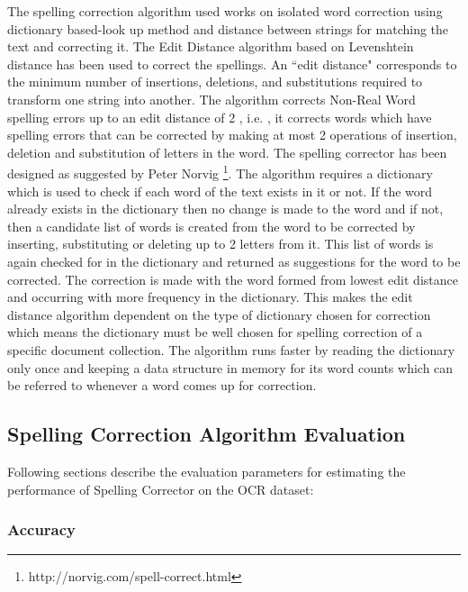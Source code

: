 \documentclass[letterpaper,11pt]{report}
\begin{document}
The spelling correction algorithm used works on isolated word correction using dictionary based-look up method and distance between strings for matching the text and correcting it.
The Edit Distance algorithm based on Levenshtein distance\cite{levenshtein1966binary} has been used to correct the spellings. An ``edit distance" corresponds to the minimum number of insertions, deletions, and substitutions required to transform one string into another. The algorithm corrects Non-Real Word spelling errors up to an edit distance of 2 , i.e. , it corrects words which have spelling errors that can be corrected by making at most 2 operations of insertion, deletion and substitution of letters in the word.
The spelling corrector has been designed as suggested by Peter Norvig \footnote{ http://norvig.com/spell-correct.html}. The algorithm requires a dictionary which is used to check if each word of the text exists in it or not. If the word already exists in the dictionary then no change is made to the word and if not, then a candidate list of words is created from the word to be corrected by inserting, substituting or deleting up to 2 letters from it. This list of words is again checked for in the dictionary and returned as suggestions for the word to be corrected. The correction is made with the word formed from lowest edit distance and occurring with more frequency in the dictionary. This makes the edit distance algorithm dependent on the type of dictionary chosen for correction which means the dictionary must be well chosen for spelling correction of a specific document collection. The algorithm runs faster by reading the dictionary only once and keeping a data structure in memory for its word counts which can be referred to whenever a word comes up for correction.

\subsection{Spelling Correction Algorithm Evaluation}
Following sections describe the evaluation parameters for estimating the performance of Spelling Corrector on the OCR dataset:

\subsubsection{Accuracy}
\end{document}
